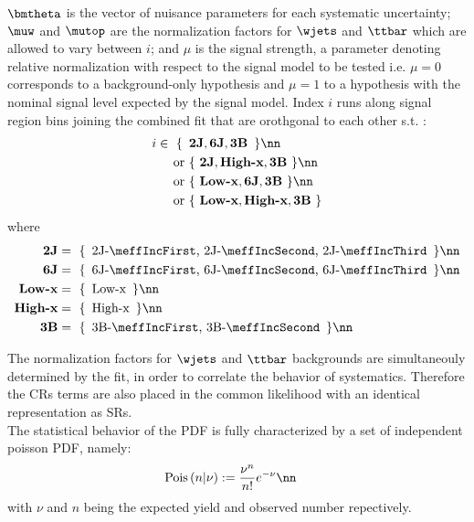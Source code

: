 $\bmtheta$ is the vector of nuisance parameters for each systematic uncertainty; 
$\muw$ and $\mutop$ are the normalization factors for $\wjets$ and $\ttbar$ which are allowed to vary between $i$; 
and $\mu$ is the signal strength, a parameter denoting relative normalization with respect to the signal model to be tested i.e. $\mu=0$ corresponds to a background-only hypothesis and $\mu=1$ to a hypothesis with the nominal signal level expected by the signal model. Index $i$ runs along signal region bins joining the combined fit that are orothgonal to each other s.t. :
%
\begin{align}
i \in \,\, \{ \,\,\, & \textbf{2J},\textbf{6J},\textbf{3B}  \,\,\, \}  \nn \\
\mbox{ or } & \{ \,\, \textbf{2J},\textbf{High-x},\textbf{3B} \,\,\}  \nn \\
\mbox{ or } & \{ \,\, \textbf{Low-x},\textbf{6J},\textbf{3B} \,\,\}  \nn \\
\mbox{ or } & \{ \,\, \textbf{Low-x},\textbf{High-x},\textbf{3B} \,\,\}
\end{align}
where
\begin{align}
\textbf{2J} & = \,\, \{ \,\,\, \mbox{2J-$\meffIncFirst$, 2J-$\meffIncSecond$, 2J-$\meffIncThird$}  \,\,\, \}  \nn \\
\textbf{6J} & = \,\, \{ \,\,\, \mbox{6J-$\meffIncFirst$, 6J-$\meffIncSecond$, 6J-$\meffIncThird$}  \,\,\, \}  \nn \\
\textbf{Low-x} & = \,\, \{ \,\,\, \mbox{Low-x}  \,\,\, \}  \nn \\
\textbf{High-x} & = \,\, \{ \,\,\,\mbox{High-x}   \,\,\, \}  \nn \\
\textbf{3B} & = \,\, \{ \,\,\, \mbox{3B-$\meffIncFirst$, 3B-$\meffIncSecond$}  \,\,\, \}  \nn \\
\end{align}

The normalization factors for $\wjets$ and $\ttbar$ backgrounds are simultaneouly determined by the fit,
in order to correlate the behavior of systematics.
Therefore the CRs terms are also placed in the common likelihood with an identical representation as SRs. \\

The statistical behavior of the PDF is fully characterized by a set of independent poisson PDF, namely:
\begin{align}
\mathrm{Pois}\,(n|\nu) & := \frac{\nu^n}{n!} e^{-\nu} \nn
\end{align}
with $\nu$ and $n$ being the expected yield and observed number repectively. \\

